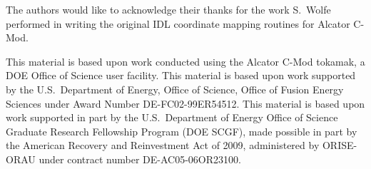 \documentclass[12pt,floatfix,showpacs]{revtex4-1}
\begin{document}
\begin{acknowledgements}
The authors would like to acknowledge their thanks for the work S.~Wolfe performed in writing the original IDL coordinate mapping routines for Alcator C-Mod.

This material is based upon work conducted using the Alcator C-Mod tokamak, a DOE Office of Science user facility.
This material is based upon work supported by the U.S.\ Department of Energy, Office of Science, Office of Fusion Energy Sciences under Award Number DE-FC02-99ER54512.
This material is based upon work supported in part by the U.S.\ Department of Energy Office of Science Graduate Research Fellowship Program (DOE SCGF), made possible in part by the American Recovery and Reinvestment Act of 2009, administered by ORISE-ORAU under contract number DE-AC05-06OR23100.

\end{acknowledgements}




\end{document}
